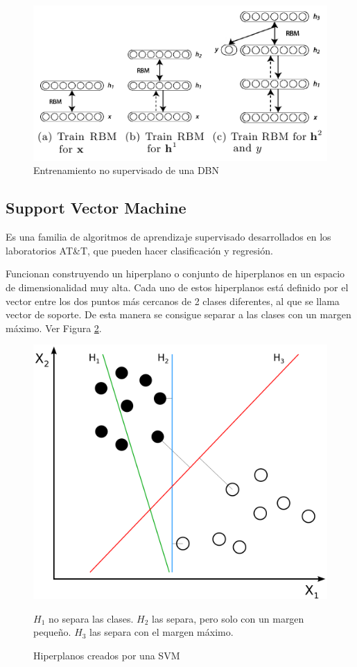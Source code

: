 \begin{figure}
    \centering
    \caption{Entrenamiento no supervisado de una DBN}
    \label{fig:dbn-train}
    \includegraphics[width=0.75\linewidth]{graficos/dbn_train.png}
\end{figure}

\subsection{Support Vector Machine}

Es una familia de algoritmos de aprendizaje supervisado desarrollados en los laboratorios AT\&T, que pueden hacer clasificación y regresión.

Funcionan construyendo un hiperplano o conjunto de hiperplanos en un espacio de dimensionalidad muy alta. Cada uno de estos hiperplanos está definido por el vector entre los dos puntos más cercanos de 2 clases diferentes, al que se llama vector de soporte. De esta manera se consigue separar a las clases con un margen máximo. Ver Figura \ref{fig:svm-hiperplanos}.

\begin{figure}
    \centering
    \caption{Hiperplanos creados por una SVM}
    \label{fig:svm-hiperplanos}
    \includegraphics[width=0.6\linewidth]{graficos/svm_hiperplanos.png}
    \par
    \small
    $H_1$ no separa las clases. $H_2$ las separa, pero solo con un margen pequeño. $H_3$ las separa con el margen máximo.
\end{figure}

